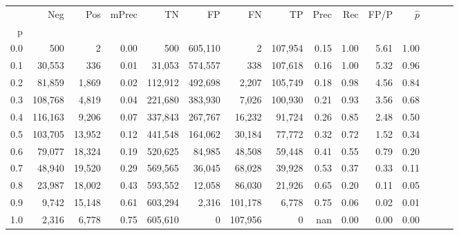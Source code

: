 \begin{tabular}{rrrrrrrrrrrrrrr}
\toprule
{} &      Neg &     Pos & mPrec &       TN &       FP &       FN &       TP &  Prec &   Rec &  FP/P & $\hat{p}$ \\
p   &          &         &       &          &          &          &          &       &       &       &           \\
\midrule
0.0 &      500 &       2 &  0.00 &      500 &  605,110 &        2 &  107,954 &  0.15 &  1.00 &  5.61 &      1.00 \\
0.1 &   30,553 &     336 &  0.01 &   31,053 &  574,557 &      338 &  107,618 &  0.16 &  1.00 &  5.32 &      0.96 \\
0.2 &   81,859 &   1,869 &  0.02 &  112,912 &  492,698 &    2,207 &  105,749 &  0.18 &  0.98 &  4.56 &      0.84 \\
0.3 &  108,768 &   4,819 &  0.04 &  221,680 &  383,930 &    7,026 &  100,930 &  0.21 &  0.93 &  3.56 &      0.68 \\
0.4 &  116,163 &   9,206 &  0.07 &  337,843 &  267,767 &   16,232 &   91,724 &  0.26 &  0.85 &  2.48 &      0.50 \\
0.5 &  103,705 &  13,952 &  0.12 &  441,548 &  164,062 &   30,184 &   77,772 &  0.32 &  0.72 &  1.52 &      0.34 \\
0.6 &   79,077 &  18,324 &  0.19 &  520,625 &   84,985 &   48,508 &   59,448 &  0.41 &  0.55 &  0.79 &      0.20 \\
0.7 &   48,940 &  19,520 &  0.29 &  569,565 &   36,045 &   68,028 &   39,928 &  0.53 &  0.37 &  0.33 &      0.11 \\
0.8 &   23,987 &  18,002 &  0.43 &  593,552 &   12,058 &   86,030 &   21,926 &  0.65 &  0.20 &  0.11 &      0.05 \\
0.9 &    9,742 &  15,148 &  0.61 &  603,294 &    2,316 &  101,178 &    6,778 &  0.75 &  0.06 &  0.02 &      0.01 \\
1.0 &    2,316 &   6,778 &  0.75 &  605,610 &        0 &  107,956 &        0 &   nan &  0.00 &  0.00 &      0.00 \\
\bottomrule
\end{tabular}
